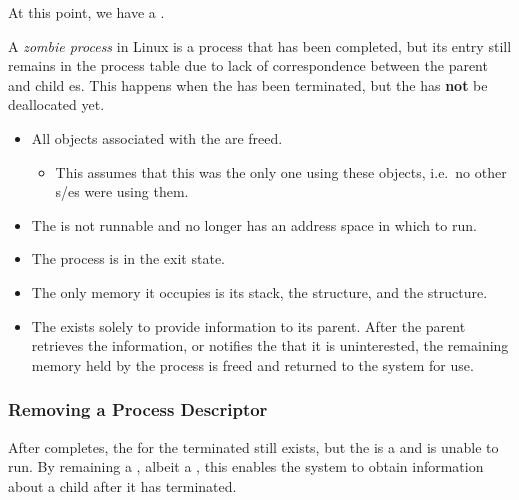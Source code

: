 At this point, we have a .

\begin{definition}\label{def:Zombie_Process}
  A \emph{zombie process} in Linux is a process that has been completed, but its entry still remains in the process table due to lack of correspondence between the parent and child es.
  This happens when the  has been terminated, but the  has \textbf{not} be deallocated yet.

  \begin{itemize}[noitemsep]
  \item All objects associated with the  are freed.
    \begin{itemize}[noitemsep]
    \item This assumes that this  was the only one using these objects, i.e.\ no other s/es were using them.
    \end{itemize}
  \item The  is not runnable and no longer has an address space in which to run.
  \item The process is in the  exit state.
  \item The only memory it occupies is its  stack, the  structure, and the  structure.
  \item The  exists solely to provide information to its parent.
    After the parent retrieves the information, or notifies the  that it is uninterested, the remaining memory held by the process is freed and returned to the system for use.
  \end{itemize}
\end{definition}

\subsubsection{Removing a Process Descriptor}\label{subsubsec:Remove_Process_Descriptor}
After  completes, the  for the terminated  still exists, but the  is a  and is unable to run.
By remaining a , albeit a , this enables the system to obtain information about a child  after it has terminated.

